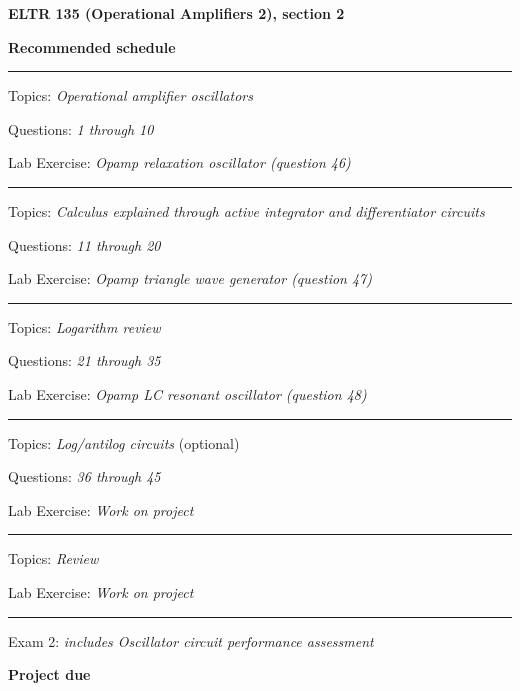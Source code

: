 
\centerline{\bf ELTR 135 (Operational Amplifiers 2), section 2} \bigskip 
 
\vskip 10pt

\noindent
{\bf Recommended schedule}

\vskip 5pt

\hrule \vskip 5pt
\noindent
{}

\hskip 10pt Topics: {\it Operational amplifier oscillators}
 
\hskip 10pt Questions: {\it 1 through 10}
 
\hskip 10pt Lab Exercise: {\it Opamp relaxation oscillator (question 46)}
 
\vskip 10pt
\hrule \vskip 5pt
\noindent
{}

\hskip 10pt Topics: {\it Calculus explained through active integrator and differentiator circuits}
 
\hskip 10pt Questions: {\it 11 through 20}
 
\hskip 10pt Lab Exercise: {\it Opamp triangle wave generator (question 47)}
 
\vskip 10pt
\hrule \vskip 5pt
\noindent
{}

\hskip 10pt Topics: {\it Logarithm review}
 
\hskip 10pt Questions: {\it 21 through 35}
 
\hskip 10pt Lab Exercise: {\it Opamp LC resonant oscillator (question 48)}
 
\vskip 10pt
\hrule \vskip 5pt
\noindent
{}

\hskip 10pt Topics: {\it Log/antilog circuits} (optional)
 
\hskip 10pt Questions: {\it 36 through 45}
 
\hskip 10pt Lab Exercise: {\it Work on project}
 
\vskip 10pt
\hrule \vskip 5pt
\noindent
{}

\hskip 10pt Topics: {\it Review}
 
\hskip 10pt Lab Exercise: {\it Work on project}
 

\vskip 10pt
\hrule \vskip 5pt
\noindent
{}

\hskip 10pt Exam 2: {\it includes Oscillator circuit performance assessment}
 
\hskip 10pt {\bf Project due}

